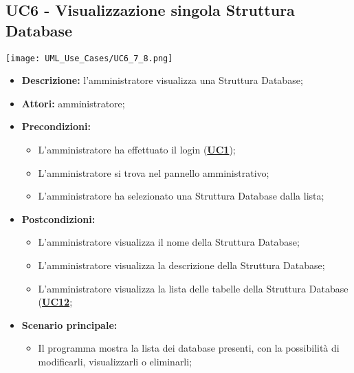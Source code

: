 \subsection{UC6 - Visualizzazione singola Struttura Database}
\label{sec:UC6}
\texttt{[image: UML\_Use\_Cases/UC6\_7\_8.png]}
\begin{itemize}
	\item \textbf{Descrizione:} l’amministratore visualizza una Struttura Database;
	\item \textbf{Attori:} amministratore;
	\item \textbf{Precondizioni:} 
	\begin{itemize}
		\item L’amministratore ha effettuato il login (\hyperref[sec:UC1]{\textbf{UC1}});
		\item L’amministratore si trova nel pannello amministrativo;
		\item L'amministratore ha selezionato una Struttura Database dalla lista;
	\end{itemize}
	\item \textbf{Postcondizioni:} 
	\begin{itemize}
		\item L'amministratore visualizza il nome della Struttura Database;
		\item L'amministratore visualizza la descrizione della Struttura Database;
		\item L'amministratore visualizza la lista delle tabelle della Struttura Database  (\hyperref[sec:UC12]{\textbf{UC12}};
	\end{itemize}
	\item \textbf{Scenario principale:} 
	\begin{itemize}
		\item Il programma mostra la lista dei database presenti, con la possibilità di modificarli, visualizzarli o eliminarli;
	\end{itemize}
\end{itemize}


